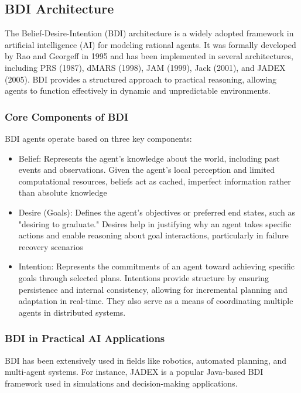 \subsection{BDI Architecture}
\label{sub:bdi_architecture}

The Belief-Desire-Intention (BDI) architecture is a widely adopted framework in artificial
intelligence (AI) for modeling rational agents. It was formally developed by Rao
and Georgeff in 1995 \cite{bdi-icmas95} and has been implemented in several
architectures, including PRS (1987), dMARS (1998), JAM (1999), Jack (2001), and JADEX
(2005). BDI provides a structured approach to practical reasoning, allowing agents
to function effectively in dynamic and unpredictable environments.

\subsubsection{Core Components of BDI}
BDI agents operate based on three key components:
\begin{itemize}
  \item Belief: Represents the agent’s knowledge about the world, including past
    events and observations. Given the agent's local perception and limited
    computational resources, beliefs act as cached, imperfect information rather
    than absolute knowledge

  \item Desire (Goals): Defines the agent’s objectives or preferred end states, such
    as "desiring to graduate." Desires help in justifying why an agent takes
    specific actions and enable reasoning about goal interactions, particularly in
    failure recovery scenarios

  \item Intention: Represents the commitments of an agent toward achieving
    specific goals through selected plans. Intentions provide structure by ensuring
    persistence and internal consistency, allowing for incremental planning and
    adaptation in real-time. They also serve as a means of coordinating multiple
    agents in distributed systems.
\end{itemize}

\subsubsection{BDI in Practical AI Applications}

BDI has been extensively used in fields like robotics, automated planning, and
multi-agent systems. For instance, JADEX is a popular Java-based BDI framework
used in simulations and decision-making applications.

